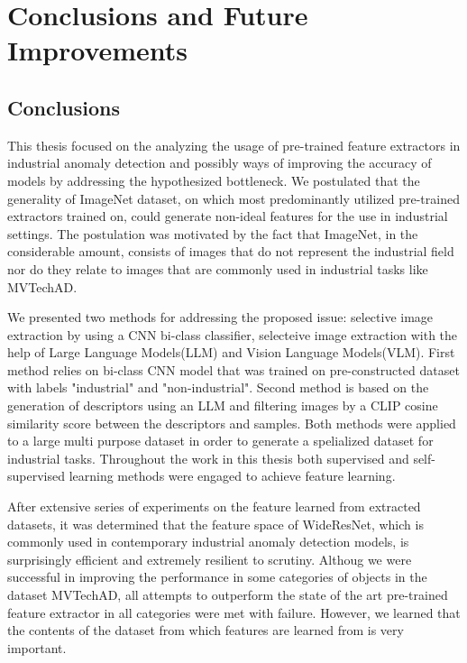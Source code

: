 \chapter{Conclusions and Future Improvements}
\label{chapter:ch5}

\section{Conclusions}

This thesis focused on the analyzing the usage of pre-trained feature extractors in industrial anomaly detection and possibly ways of improving the accuracy of models by addressing the hypothesized bottleneck. We postulated that the generality of ImageNet dataset, on which most predominantly utilized pre-trained extractors trained on, could generate non-ideal features for the use in industrial settings. The postulation was motivated by the fact that ImageNet, in the considerable amount, consists of images that do not represent the industrial field nor do they relate to images that are commonly used in industrial tasks like MVTechAD. 

We presented two methods for addressing the proposed issue: selective image extraction by using a CNN bi-class classifier, selecteive image extraction with the help of Large Language Models(LLM) and Vision Language Models(VLM). First method relies on bi-class CNN model that was trained on pre-constructed dataset with labels "industrial" and "non-industrial". Second method is based on the generation of descriptors using an LLM and filtering images by a CLIP cosine similarity score between the descriptors and samples. Both methods were applied to a large multi purpose dataset in order to generate a spelialized dataset for industrial tasks. Throughout the work in this thesis both supervised and self-supervised learning methods were engaged to achieve feature learning.

After extensive series of experiments on the feature learned from extracted datasets, it was determined that the feature space of WideResNet, which is commonly used in contemporary industrial anomaly detection models, is surprisingly efficient and extremely resilient to scrutiny. Althoug we were successful in improving the performance in some categories of objects in the dataset MVTechAD, all attempts to outperform the state of the art pre-trained feature extractor in all categories were met with failure. However, we learned that the contents of the dataset from which features are learned from is very important.

